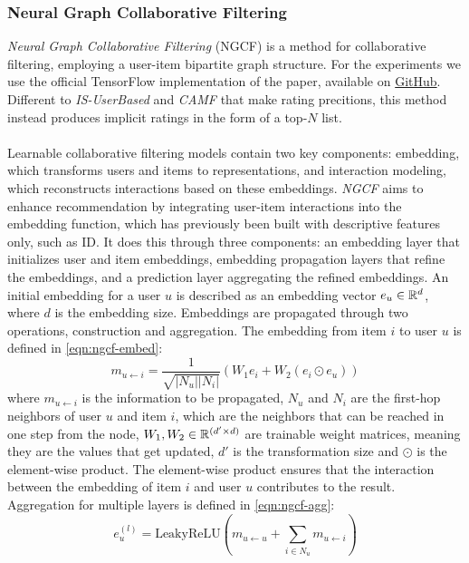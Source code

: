 \subsubsection{Neural Graph Collaborative Filtering}\label{subsec:ngcf-desc}
\textit{Neural Graph Collaborative Filtering} (NGCF) is a method for collaborative filtering, employing a user-item bipartite graph structure.
For the experiments we use the official TensorFlow implementation of the paper, available on \href{https://github.com/xiangwang1223/neural_graph_collaborative_filtering}{GitHub}.
Different to \textit{IS-UserBased} and \textit{CAMF} that make rating precitions, this method instead produces implicit ratings in the form of a top-$N$ list.
\\\\
Learnable collaborative filtering models contain two key components: embedding, which transforms users and items to representations, and interaction modeling, which reconstructs interactions based on these embeddings.
\textit{NGCF} aims to enhance recommendation by integrating user-item interactions into the embedding function, which has previously been built with descriptive features only, such as ID.
It does this through three components: an embedding layer that initializes user and item embeddings, embedding propagation layers that refine the embeddings, and a prediction layer aggregating the refined embeddings.
An initial embedding for a user $u$ is described as an embedding vector $e_u \in \mathbb{R}^d$, where $d$ is the embedding size.
Embeddings are propagated through two operations, construction and aggregation.
The embedding from item $i$ to user $u$ is defined in \cref{eqn:ngcf-embed}:
\begin{equation}\label{eqn:ngcf-embed}
    m_{u \leftarrow i} = \frac{1}{\sqrt{|N_u||N_i|}} (W_1e_i + W_2(e_i \odot e_u))
\end{equation}
where $m_{u \leftarrow i}$ is the information to be propagated, $N_u$ and $N_i$ are the first-hop neighbors of user $u$ and item $i$, which are the neighbors that can be reached in one step from the node, $W_1, W_2 \in \mathbb{R}^{(d' \times d)}$ are trainable weight matrices, meaning they are the values that get updated, $d'$ is the transformation size and $\odot$ is the element-wise product.
The element-wise product ensures that the interaction between the embedding of item $i$ and user $u$ contributes to the result.
Aggregation for multiple layers is defined in \cref{eqn:ngcf-agg}:
\begin{equation}\label{eqn:ngcf-agg}
    e_{u}^{(l)} = \textrm{LeakyReLU}(m_{u \leftarrow u} + \sum_{i \in N_u} m_{u \leftarrow i})
\end{equation}
